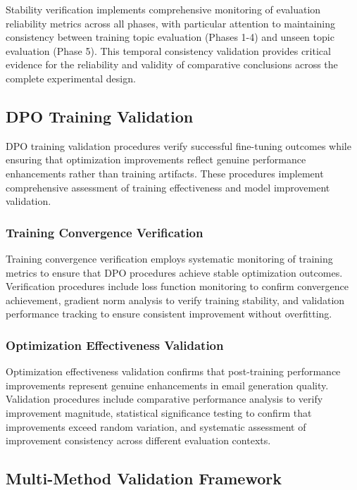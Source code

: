 Stability verification implements comprehensive monitoring of evaluation reliability metrics across all phases, with particular attention to maintaining consistency between training topic evaluation (Phases 1-4) and unseen topic evaluation (Phase 5). This temporal consistency validation provides critical evidence for the reliability and validity of comparative conclusions across the complete experimental design.

\subsection{DPO Training Validation}

DPO training validation procedures verify successful fine-tuning outcomes while ensuring that optimization improvements reflect genuine performance enhancements rather than training artifacts. These procedures implement comprehensive assessment of training effectiveness and model improvement validation.

\subsubsection{Training Convergence Verification}

Training convergence verification employs systematic monitoring of training metrics to ensure that DPO procedures achieve stable optimization outcomes. Verification procedures include loss function monitoring to confirm convergence achievement, gradient norm analysis to verify training stability, and validation performance tracking to ensure consistent improvement without overfitting.

\subsubsection{Optimization Effectiveness Validation}

Optimization effectiveness validation confirms that post-training performance improvements represent genuine enhancements in email generation quality. Validation procedures include comparative performance analysis to verify improvement magnitude, statistical significance testing to confirm that improvements exceed random variation, and systematic assessment of improvement consistency across different evaluation contexts.

\subsection{Multi-Method Validation Framework}
\label{sec:multi-method-validation}

